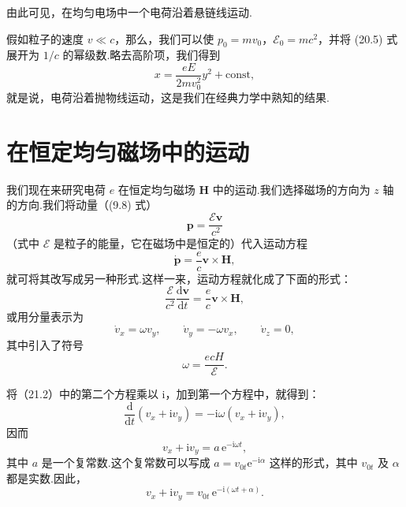 由此可见，在均匀电场中一个电荷沿着悬链线运动.

假如粒子的速度 $v\ll c$，那么，我们可以使 $p_0=mv_0$，$\mathcal{E}_0=mc^2$，并将 (20.5)
式展开为 $1/c$ 的幂级数.略去高阶项，我们得到
\begin{equation*}
  x=\frac{eE}{2mv_0^2}y^2+\mathrm{const},
\end{equation*}
就是说，电荷沿着抛物线运动，这是我们在经典力学中熟知的结果.

\section{在恒定均匀磁场中的运动}

我们现在来研究电荷 $e$ 在恒定均匀磁场 $\boldsymbol{H}$ 中的运动.我们选择磁场的方向为 $z$ 轴的方向.我们将动量（(9.8) 式）
\begin{equation*}
  \boldsymbol{p}=\frac{\mathcal{E}\boldsymbol{v}}{c^2}
\end{equation*}
（式中 $\mathcal{E}$ 是粒子的能量，它在磁场中是恒定的）代入运动方程
\begin{equation*}
  \dot{\boldsymbol{p}}=\frac{e}{c}\boldsymbol{v}\times\boldsymbol{H},
\end{equation*}
就可将其改写成另一种形式.这样一来，运动方程就化成了下面的形式：
\begin{equation}
  \frac{\mathcal{E}}{c^2}\frac{\mathrm{d}\boldsymbol{v}}{\mathrm{d}t}
  =\frac{e}{c}\boldsymbol{v}\times\boldsymbol{H},
\end{equation}
或用分量表示为
\begin{equation}
  \dot{v}_x=\omega v_y,\qquad
  \dot{v}_y=-\omega v_x,\qquad
  \dot{v}_z=0,
\end{equation}
其中引入了符号
\begin{equation}
  \omega=\frac{ecH}{\mathcal{E}}.
\end{equation}

将（21.2）中的第二个方程乘以 $\mathrm{i}$，加到第一个方程中，就得到：
\begin{equation*}
  \frac{\mathrm{d}}{\mathrm{d}t}\left(v_x+\mathrm{i}v_y\right)
  =-\mathrm{i}\omega\left(v_x+\mathrm{i}v_y\right),
\end{equation*}
因而
\begin{equation*}
  v_x+\mathrm{i}v_y=a\,\mathrm{e}^{-\mathrm{i}\omega t},
\end{equation*}
其中 $a$ 是一个复常数.这个复常数可以写成 $a=v_{0t}\mathrm{e}^{-\mathrm{i}\alpha}$ 这样的形式，其中
$v_{0t}$ 及 $\alpha$ 都是实数.因此，
\begin{equation*}
  v_x+\mathrm{i}v_y=v_{0t}\,\mathrm{e}^{-\mathrm{i}(\omega t+\alpha)}.
\end{equation*}

